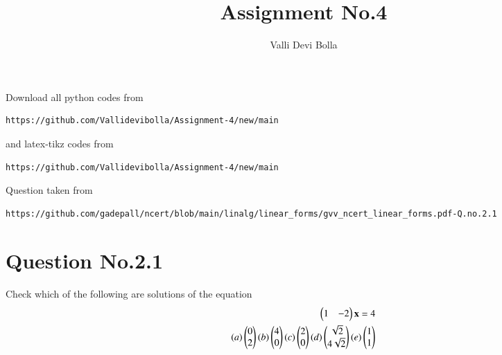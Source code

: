 \documentclass[journal,12pt,twocolumn]{IEEEtran}
\begin{document}
\def\rightbox#1{\makebox[0in][r]{#1}}
\def\centbox#1{\makebox[0in]{#1}}
\def\topbox#1{\raisebox{-\baselineskip}[0in][0in]{#1}}
\def\midbox#1{\raisebox{-0.5\baselineskip}[0in][0in]{#1}}
\vspace{3cm}
\title{Assignment No.4}
\author{Valli Devi Bolla}
\maketitle
\newpage
\bigskip
\renewcommand{\thefigure}{\theenumi}
\renewcommand{\thetable}{\theenumi}
Download all python codes from
\begin{lstlisting}
https://github.com/Vallidevibolla/Assignment-4/new/main
\end{lstlisting}
%
and latex-tikz codes from
%
\begin{lstlisting}
https://github.com/Vallidevibolla/Assignment-4/new/main
\end{lstlisting}
%
Question taken from
\begin{lstlisting}
https://github.com/gadepall/ncert/blob/main/linalg/linear_forms/gvv_ncert_linear_forms.pdf-Q.no.2.1
\end{lstlisting}
%
\section{Question No.2.1}
Check which of the following are solutions of the equation
\begin{align}
\begin{pmatrix}1&-2\end{pmatrix}\mathbf{x}=4\\
(a)\begin{pmatrix}0\\2\end{pmatrix} (b)\begin{pmatrix}4\\0\end{pmatrix} (c)\begin{pmatrix}2\\0\end{pmatrix} (d)\begin{pmatrix}\sqrt{2}\\4\sqrt{2}\end{pmatrix} (e)\begin{pmatrix}1\\1\end{pmatrix}
\end{align}
\end{document}
